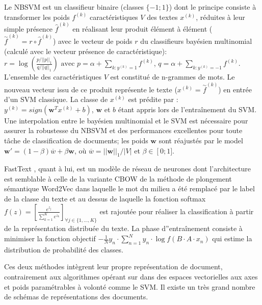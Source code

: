 Le NBSVM \citep{wang2012nbsvm} est un classifieur binaire (classes $\lbrace -1; 1 \rbrace$) dont le principe consiste à transformer les poids $f^{(k)}$ caractéristiques $V$ des textes $x^{(k)}$, réduites à leur simple présence $\widehat{f}^{(k)}$ en réalisant leur produit élément à élément ($\overset{\sim}{f}^{(k)} = {r} \circ \widehat{f}^{(k)}$) avec le vecteur de poids $r$ du classifieurs bayésien multinomial (calculé avec le vecteur présence de caractéristique):
$r = \log \left( \frac{p/\vert\vert p \vert\vert_1}{q / \vert\vert q \vert\vert_1}\right)
\text{ avec } p=\alpha + \sum\limits_{k:y^{(k)}=1}{f}^{(k)}$, $q=\alpha + \sum\limits_{k:y^{(k)}=-1}{f}^{(k)}$. L'ensemble des caractéristiques $V$ est constitué de n-grammes de mots. Le nouveau vecteur issu de ce produit représente le texte ($x^{(k)} = \overset{\sim}{f}^{(k)}$) en entrée d'un SVM classique. La classe de $x^{(k)}$ est prédite par : $y^{(k)} = sign(\mathbf{w}^Tx^{(k)} + b)$, $\mathbf{w}$ et $b$ étant appris lors de l'entraînement du SVM. Une interpolation  entre le bayésien multinomial et le SVM est nécessaire pour assurer la robustesse du NBSVM et des performances excellentes pour toute tâche de classification de documents; les poids $\mathbf{w}$ sont réajustés par le model $\mathbf{w'} = (1 - \beta) \overline{w} + \beta \mathbf{w}$, où $\overline{w} = \vert\vert \mathbf{w}\vert\vert_1 / \vert V \vert$ et $\beta \in \left[0; 1] \right.$. 
  
 FastText \citep{grave2017fasttextcls}, quant à lui, est un modèle de réseau de neurones dont l'architecture est semblable à celle de la variante CBOW de la méthode de plongement sémantique Word2Vec dans laquelle le mot du milieu a été remplacé par le label de la classe du texte et au dessus de laquelle la fonction softmax $f(z) = \left[ \frac{e^{z_j}}{\sum\limits_{k=1}^K e^{z_k}} \right]_{\forall j \in \lbrace 1, ..., K \rbrace} $ est rajoutée pour réaliser la classification à partir de la représentation distribuée du texte. La phase d''entraînement consiste à minimiser la fonction objectif $-\frac{1}{N}y_n \cdot \sum\limits_{n=1}^N y_n \cdot \log{f(B\cdot A\cdot x_n)}$ qui estime la distribution de probabilité des classes.

Ces deux méthodes intègrent leur propre représentation de document, contrairement aux algorithmes opérant sur dans des espaces vectorielles aux axes et poids paramétrables à volonté comme le SVM. Il existe un très grand nombre de schémas de représentations des documents.

